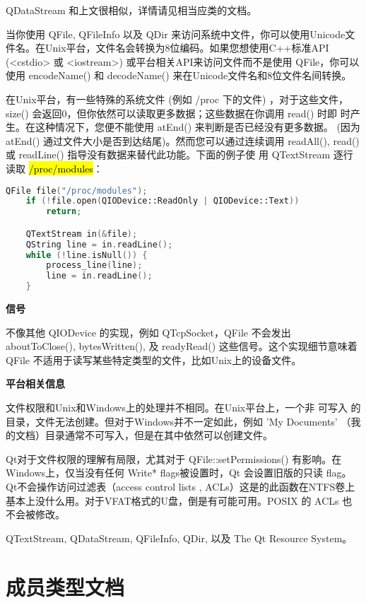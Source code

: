 QDataStream 和上文很相似，详情请见相当应类的文档。

当你使用 QFile, QFileInfo 以及 QDir 来访问系统中文件，你可以使用Unicode文件名。在Unix平台，文件名会转换为8位编码。如果您想使用C++标准API (<cstdio> 或 <iostream>) 或平台相关API来访问文件而不是使用 QFile，你可以使用 encodeName() 和 decodeName() 来在Unicode文件名和8位文件名间转换。

在Unix平台，有一些特殊的系统文件 (例如 /proc 下的文件) ，对于这些文件，
size() 会返回0，但你依然可以读取更多数据；这些数据在你调用 read() 时即
时产生。在这种情况下，您便不能使用 atEnd() 来判断是否已经没有更多数据。
(因为 atEnd() 通过文件大小是否到达结尾)。然而您可以通过连续调用
readAll(), read() 或 readLine() 指导没有数据来替代此功能。下面的例子使
用 QTextStream 逐行读取 \hl{/proc/modules}：

\begin{lstlisting}[language=C++]
    QFile file("/proc/modules");
    if (!file.open(QIODevice::ReadOnly | QIODevice::Text))
        return;

    QTextStream in(&file);
    QString line = in.readLine();
    while (!line.isNull()) {
        process_line(line);
        line = in.readLine();
    }
\end{lstlisting}

\textbf{信号}

不像其他 QIODevice 的实现，例如 QTcpSocket，QFile 不会发出 aboutToClose(), bytesWritten(), 及 readyRead() 这些信号。这个实现细节意味着 QFile 不适用于读写某些特定类型的文件，比如Unix上的设备文件。

\textbf{平台相关信息}

文件权限和Unix和Windows上的处理并不相同。在Unix平台上，一个非 可写入 的目录，文件无法创建。但对于Windows并不一定如此，例如 'My Documents' （我的文档）目录通常不可写入，但是在其中依然可以创建文件。

Qt对于文件权限的理解有局限，尤其对于 QFile::setPermissions() 有影响。在Windows上，仅当没有任何 Write* flags被设置时，Qt 会设置旧版的只读 flag。Qt不会操作访问过滤表（access control lists , ACLs）这是的此函数在NTFS卷上基本上没什么用。对于VFAT格式的U盘，倒是有可能可用。POSIX 的 ACLs 也不会被修改。


\begin{seeAlso}
QTextStream, QDataStream, QFileInfo, QDir, 以及 The Qt
Resource System。
\end{seeAlso} 

\splitLine

\section{成员类型文档}

